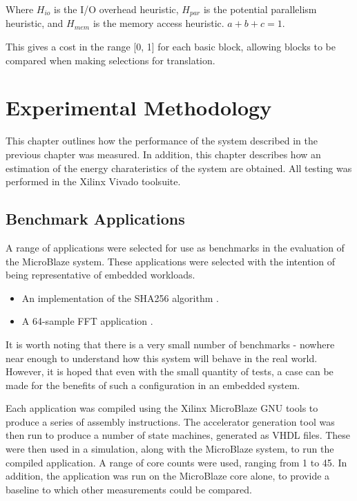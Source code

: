 \documentclass{UoYCSproject}
\begin{document}
Where \(H_{io}\) is the I/O overhead heuristic, \(H_{par}\) is the potential parallelism heuristic, and \(H_{mem}\) is the
memory access heuristic. \(a + b + c = 1\).

This gives a cost in the range [0, 1] for each basic block, allowing blocks to be compared when making selections for translation.

\chapter{Experimental Methodology}

This chapter outlines how the performance of the system described in the previous chapter was measured.
In addition, this chapter describes how an estimation of the energy charateristics of the system are obtained.
All testing was performed in the Xilinx Vivado toolsuite.

\section{Benchmark Applications}

A range of applications were selected for use as benchmarks in the evaluation of the MicroBlaze system. These applications
were selected with the intention of being representative of embedded workloads.

\begin{itemize}
  \item An implementation of the SHA256 algorithm \cite{sha256}.
  \item A 64-sample FFT application \cite{fft}.
\end{itemize}

It is worth noting that there is a very small number of benchmarks - nowhere near enough to understand how this system
will behave in the real world. However, it is hoped that even with the small quantity of tests, a case can be made for the
benefits of such a configuration in an embedded system.

Each application was compiled using the Xilinx MicroBlaze GNU tools to produce a series of assembly instructions. The
accelerator generation tool was then run to produce a number of state machines, generated as VHDL files.
These were then used in a simulation, along with the MicroBlaze system, to run the compiled application.
A range of core counts were used, ranging from 1 to 45. In addition, the application was run on the MicroBlaze core alone,
to provide a baseline to which other measurements could be compared.
\end{document}
